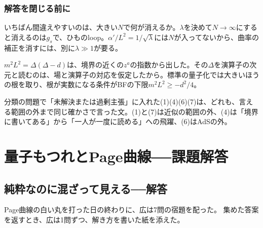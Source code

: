 \documentclass[paper=b5j,fontsize=11Q,jafontsize=11Q,baselineskip=19Q]{jlreq}
\newcommand{\runningtitle}{章題未定}
\numberwithin{equation}{section}
\begin{document}
\subsubsection*{解答を閉じる前に}

いちばん間違えやすいのは、大きい$N$で何が消えるか。$\lambda$を決めて$N\to\infty$にすると消えるのは$g_s$で、ひものloop。$\alpha'/L^2=1/\sqrt\lambda$には$N$が入ってないから、曲率の補正を消すには、別に$\lambda\gg1$が要る。

$m^2L^2=\Delta(\Delta-d)$は、境界の近くの$z^a$の指数から出した。その$\Delta$を演算子の次元と読むのは、場と演算子の対応を仮定したから。標準の量子化では大きいほうの根を取り、根が実数になる条件がBFの下限$m^2L^2\ge-d^2/4$。

分類の問題で「未解決または過剰主張」に入れた(1)(4)(6)(7)は、どれも、言える範囲の外まで同じ確かさで言った文。(1)と(7)は近似の範囲の外、(4)は「境界に書いてある」から「一人が一度に読める」への飛躍、(6)はAdSの外。


\clearpage
\endgroup
\begingroup
\renewcommand{\runningtitle}{解答 第13章　量子もつれとPage曲線}
\newcommand{\Tr}{\operatorname{Tr}}
\newcommand{\cH}{\mathcal H}
\newcommand{\id}{\mathbf 1}
\newcommand{\ket}[1]{\lvert#1\rangle}
\newcommand{\bra}[1]{\langle#1\rvert}
\newcommand{\SBH}{S_{\mathrm{BH}}}
\newcommand{\SPage}{S_{\mathrm{Page}}}
\renewcommand{\runningtitle}{解答 第13章　量子もつれとPage曲線}
\section[量子もつれとPage曲線　課題解答]{量子もつれとPage曲線──課題解答}
\subsection{純粋なのに混ざって見える──解答}

Page曲線の白い丸を打った日の終わりに、広は7問の宿題を配った。
集めた答案を返すとき、広は1問ずつ、解き方を書いた紙を添えた。
\end{document}
